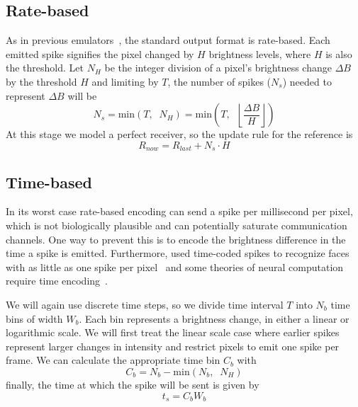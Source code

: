 \documentclass[conference]{IEEEtran}
\begin{document}
\subsection{Rate-based}
As in previous emulators~\cite{DVSemu}, the standard output format is rate-based. Each emitted spike signifies the pixel changed by $H$ brightness levels, where $H$ is also the threshold. Let $N_{H}$ be the integer division of a pixel's brightness change $\Delta B$ by the threshold $H$ and limiting by $T$, the number of spikes ($N_{s}$) needed to represent $\Delta B$ will be
\begin{equation}
  \label{eq:num_spikes_rate}
  N_{s} = \mathrm{min}\left( T, \;\; N_{H} \right) = \mathrm{min}\left( T, \;\; \left\lfloor\frac{\Delta B}{H}\right\rfloor \right)
\end{equation}
At this stage we model a perfect receiver, so the update rule for the reference is
\begin{equation}
  \label{eq:ref_update}
  R_{now} = R_{last} + N_{s}\cdot H
\end{equation}

\subsection{Time-based}
In its worst case rate-based encoding can send a spike per millisecond per pixel, which is not biologically plausible and can potentially saturate communication channels. One way to prevent this is to encode the brightness difference in the time a spike is emitted. Furthermore, \citeauthor{Delorme2001795} used time-coded spikes to recognize faces with as little as one spike per pixel~\cite{Delorme2001795} and some theories of neural computation require time encoding~\cite{izhikevich2006polychronization}.

We will again use discrete time steps, so we divide time interval $T$ into $N_{b}$ time bins of width $W_{b}$. Each bin represents a brightness change, in either a linear or logarithmic scale. We will first treat the linear scale case where earlier spikes represent larger changes in intensity and restrict pixels to emit one spike per frame. We can calculate the appropriate time bin $C_{b}$ with
\begin{equation}
\label{eq:linear_bin_calc}
C_{b} = N_{b} - \mathrm{min}\left( N_{b}, \;\; N_{H} \right) 
\end{equation}
finally, the time at which the spike will be sent is given by
\begin{equation}
t_{s} = C_{b}W_{b}
\end{equation}
\end{document}
